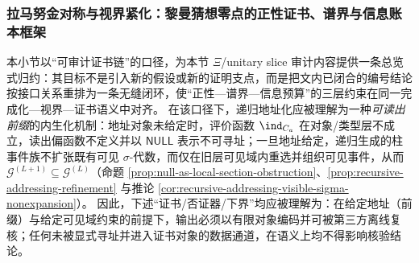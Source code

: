 \subsubsection{拉马努金对称与视界紧化：黎曼猜想零点的正性证书、谱界与信息账本框架}\label{subsubsec:xi-ramanujan-horizon-ledger-framework}
本小节以“可审计证书链”的口径，为本节 \(\Xi\)/unitary slice 审计内容提供一条总览式归约：其目标不是引入新的假设或新的证明支点，而是把文内已闭合的编号结论按接口关系重排为一条无缝闭环，使“正性—谱界—信息预算”的三层约束在同一完成化—视界—证书语义中对齐。
在该口径下，递归地址化应被理解为一种\emph{可读出前缀}的内生化机制：地址对象未给定时，评价函数 \(\ind_{C_a}\) 在对象/类型层不成立，读出偏函数不定义并以 \(\mathsf{NULL}\) 表示不可寻址；一旦地址给定，递归生成的柱事件族不扩张既有可见 \(\sigma\)-代数，而仅在旧层可见域内重选并组织可见事件，从而 \(\mathcal{G}^{(L+1)}\subseteq\mathcal{G}^{(L)}\)（命题 \ref{prop:null-as-local-section-obstruction}、\ref{prop:recursive-addressing-refinement} 与推论 \ref{cor:recursive-addressing-visible-sigma-nonexpansion}）。
因此，下述“证书/否证器/下界”均应被理解为：在给定地址（前缀）与给定可见域约束的前提下，输出必须以有限对象编码并可被第三方离线复核；任何未被显式寻址并进入证书对象的数据通道，在语义上均不得影响核验结论。

